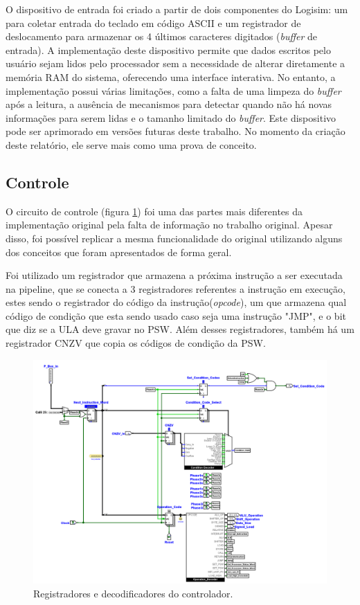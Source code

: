 \documentclass[
	article,			%
	11pt,				%
	oneside,			%
	a4paper,			%
	english,			%
	brazil,				%
	sumario=tradicional
	]{abntex2}
\begin{document}
O dispositivo de entrada foi criado a partir de dois componentes do Logisim: um para coletar entrada do teclado em código ASCII e um registrador de deslocamento para armazenar os 4 últimos caracteres digitados (\textit{buffer} de entrada). A implementação deste dispositivo permite que dados escritos pelo usuário sejam lidos pelo processador sem a necessidade de alterar diretamente a memória RAM do sistema, oferecendo uma interface interativa. No entanto, a implementação possui várias limitações, como a falta de uma limpeza do \textit{buffer} após a leitura, a ausência de mecanismos para detectar quando não há novas informações para serem lidas e o tamanho limitado do \textit{buffer}. Este dispositivo pode ser aprimorado em versões futuras deste trabalho. No momento da criação deste relatório, ele serve mais como uma prova de conceito.

 \subsection{Controle}\label{cap:controller}

O circuito de controle (figura \ref{fig:controller1}) foi uma das partes mais diferentes da implementação original pela falta de informação no trabalho original. Apesar disso, foi possível replicar a mesma funcionalidade do original utilizando alguns dos conceitos que foram apresentados de forma geral. 

Foi utilizado um registrador que armazena a próxima instrução a ser executada na pipeline, que se conecta a 3 registradores referentes a instrução em execução, estes sendo o registrador do código da instrução(\textit{opcode}), um que armazena qual código de condição que esta sendo usado caso seja uma instrução "JMP", e o bit que diz se a ULA deve gravar no PSW.  Além desses registradores, também há um registrador CNZV que copia os códigos de condição da PSW.

\begin{figure}[H]
    \centering
    \includegraphics[width=0.75\linewidth]{Logisim/controller1.png}
    \caption{Registradores e decodificadores do controlador.}
    \label{fig:controller1}
\end{figure}
\end{document}

